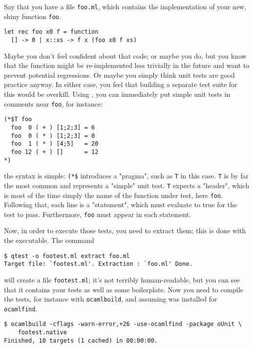 
Say that you have a file \texttt{foo.ml}, which contains the implementation of your new, shiny
function \texttt{foo}.

\begin{verbatim}
let rec foo x0 f = function
  [] -> 0 | x::xs -> f x (foo x0 f xs)
\end{verbatim}


Maybe you don't feel confident about that code; or maybe you do, but you know that the
function might be re-implemented less trivially in the future and want to prevent
potential regressions. Or maybe you simply think unit tests are good practice anyway. In
either case, you feel that building a separate test suite for this would be overkill.
Using \qtest{}, you can immediately put simple unit tests in comments near \texttt{foo}, for
instance:

\begin{verbatim}
(*$T foo
  foo  0 ( + ) [1;2;3] = 6
  foo  0 ( * ) [1;2;3] = 0
  foo  1 ( * ) [4;5]   = 20
  foo 12 ( + ) []      = 12
*)
\end{verbatim}

the syntax is simple: \texttt{(*\$} introduces a \qtest{} "pragma", such as \texttt{T} in this case. \texttt{T}
is by far the most common and represents a "simple" unit test. \texttt{T} expects a "header",
which is most of the time simply the name of the function under test, here \texttt{foo}.
Following that, each line is a "statement", which must evaluate to true for the test to
pass. Furthermore, \texttt{foo} must appear in each statement.

Now, in order to execute those tests, you need to extract them; this is done with the
\qtest{} executable. The command

\Oconsole
\begin{verbatim}
$ qtest -o footest.ml extract foo.ml
Target file: `footest.ml'. Extraction : `foo.ml' Done.
\end{verbatim}

will create a file \texttt{footest.ml}; it's not terribly human-readable, but you can see that it
contains your tests as well as some \ounit{} boilerplate. Now you need to compile the
tests, for instance with \texttt{ocamlbuild}, and assuming \ounit{} was installed for \texttt{ocamlfind}.

\begin{verbatim}
$ ocamlbuild -cflags -warn-error,+26 -use-ocamlfind -package oUnit \
    footest.native
Finished, 10 targets (1 cached) in 00:00:00.
\end{verbatim}

